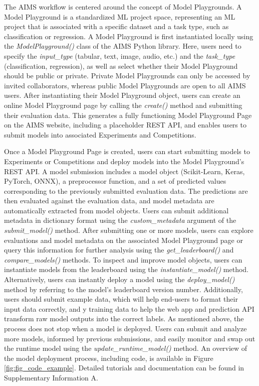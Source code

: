 The AIMS workflow is centered around the concept of Model Playgrounds. A Model Playground is a standardized ML project space, representing an ML project that is associated with a specific dataset and a task type, such as classification or regression. A Model Playground is first instantiated locally using the \textit{ModelPlayground()} class of the AIMS Python library. Here, users need to specify the \textit{input\_type} (tabular, text, image, audio, etc.) and the \textit{task\_type} (classification, regression), as well as select whether their Model Playground should be public or private. Private Model Playgrounds can only be accessed by invited collaborators, whereas public Model Playgrounds are open to all AIMS users. After instantiating their Model Playground object, users can create an online Model Playground page by calling the \textit{create()} method and submitting their evaluation data. This generates a fully functioning Model Playground Page on the AIMS website, including a placeholder REST API, and enables users to submit models into associated Experiments and Competitions. 

Once a Model Playground Page is created, users can start submitting models to Experiments or Competitions and deploy models into the Model Playground’s REST API. A model submission includes a model object (Scikit-Learn, Keras, PyTorch, ONNX), a preprocessor function, and a set of predicted values corresponding to the previously submitted evaluation data. The predictions are then evaluated against the evaluation data, and model metadata are automatically extracted from model objects. Users can submit additional metadata in dictionary format using the \textit{custom\_metadata} argument of the \textit{submit\_model()} method. After submitting one or more models, users can explore evaluations and model metadata on the associated Model Playground page or query this information for further analysis using the \textit{get\_leaderboard()} and \textit{compare\_models()} methods. To inspect and improve model objects, users can instantiate models from the leaderboard using the \textit{instantiate\_model()} method. Alternatively, users can instantly deploy a model using the \textit{deploy\_model()} method by referring to the model’s leaderboard version number. Additionally, users should submit example data, which will help end-users to format their input data correctly, and y training data to help the web app and prediction API transform raw model outputs into the correct labels. As mentioned above, the process does not stop when a model is deployed. Users can submit and analyze more models, informed by previous submissions, and easily monitor and swap out the runtime model using the \textit{update\_runtime\_model()} method. An overview of the model deployment process, including code, is available in Figure \ref{fig:fig_code_example}. Detailed tutorials and documentation can be found in Supplementary Information A.

